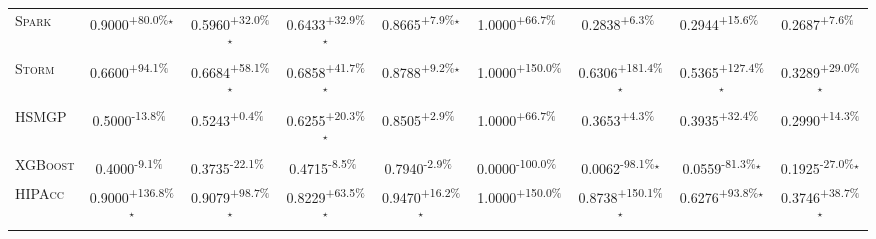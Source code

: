 \begin{table}[htbp]
\begin{tabular}{l|cccc|cccc}
\textsc{Spark} & \cellcolor{green!30}0.9000\textsuperscript{+80.0\%}$^\star$ & \cellcolor{green!30}0.5960\textsuperscript{+32.0\%}$^\star$ & \cellcolor{green!30}0.6433\textsuperscript{+32.9\%}$^\star$ & \cellcolor{green!30}0.8665\textsuperscript{+7.9\%}$^\star$ & \cellcolor{green!30}1.0000\textsuperscript{+66.7\%}$^{\,\,\,}$ & \cellcolor{green!30}0.2838\textsuperscript{+6.3\%}$^{\,\,\,}$ & \cellcolor{green!30}0.2944\textsuperscript{+15.6\%}$^{\,\,\,}$ & \cellcolor{green!30}0.2687\textsuperscript{+7.6\%}$^{\,\,\,}$ \\
\textsc{Storm} & \cellcolor{green!30}0.6600\textsuperscript{+94.1\%}$^{\,\,\,}$ & \cellcolor{green!30}0.6684\textsuperscript{+58.1\%}$^\star$ & \cellcolor{green!30}0.6858\textsuperscript{+41.7\%}$^\star$ & \cellcolor{green!30}0.8788\textsuperscript{+9.2\%}$^\star$ & \cellcolor{green!30}1.0000\textsuperscript{+150.0\%}$^{\,\,\,}$ & \cellcolor{green!30}0.6306\textsuperscript{+181.4\%}$^\star$ & \cellcolor{green!30}0.5365\textsuperscript{+127.4\%}$^\star$ & \cellcolor{green!30}0.3289\textsuperscript{+29.0\%}$^\star$ \\
\textsc{HSMGP} & \cellcolor{red!30}0.5000\textsuperscript{-13.8\%}$^{\,\,\,}$ & \cellcolor{green!30}0.5243\textsuperscript{+0.4\%}$^{\,\,\,}$ & \cellcolor{green!30}0.6255\textsuperscript{+20.3\%}$^\star$ & \cellcolor{green!30}0.8505\textsuperscript{+2.9\%}$^{\,\,\,}$ & \cellcolor{green!30}1.0000\textsuperscript{+66.7\%}$^{\,\,\,}$ & \cellcolor{green!30}0.3653\textsuperscript{+4.3\%}$^{\,\,\,}$ & \cellcolor{green!30}0.3935\textsuperscript{+32.4\%}$^{\,\,\,}$ & \cellcolor{green!30}0.2990\textsuperscript{+14.3\%}$^{\,\,\,}$ \\
\textsc{XGBoost} & \cellcolor{red!30}0.4000\textsuperscript{-9.1\%}$^{\,\,\,}$ & \cellcolor{red!30}0.3735\textsuperscript{-22.1\%}$^{\,\,\,}$ & \cellcolor{red!30}0.4715\textsuperscript{-8.5\%}$^{\,\,\,}$ & \cellcolor{red!30}0.7940\textsuperscript{-2.9\%}$^{\,\,\,}$ & \cellcolor{red!30}0.0000\textsuperscript{-100.0\%}$^{\,\,\,}$ & \cellcolor{red!30}0.0062\textsuperscript{-98.1\%}$^\star$ & \cellcolor{red!30}0.0559\textsuperscript{-81.3\%}$^\star$ & \cellcolor{red!30}0.1925\textsuperscript{-27.0\%}$^\star$ \\
\textsc{HIPAcc} & \cellcolor{green!30}0.9000\textsuperscript{+136.8\%}$^\star$ & \cellcolor{green!30}0.9079\textsuperscript{+98.7\%}$^\star$ & \cellcolor{green!30}0.8229\textsuperscript{+63.5\%}$^\star$ & \cellcolor{green!30}0.9470\textsuperscript{+16.2\%}$^\star$ & \cellcolor{green!30}1.0000\textsuperscript{+150.0\%}$^{\,\,\,}$ & \cellcolor{green!30}0.8738\textsuperscript{+150.1\%}$^\star$ & \cellcolor{green!30}0.6276\textsuperscript{+93.8\%}$^\star$ & \cellcolor{green!30}0.3746\textsuperscript{+38.7\%}$^\star$ \\

\end{tabular}
\end{table}
